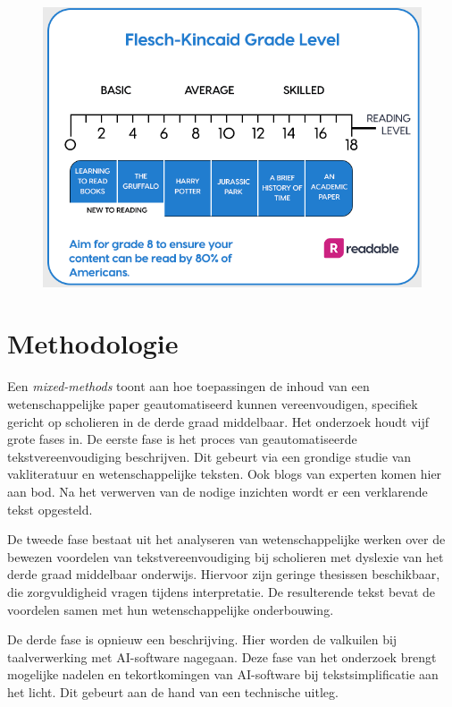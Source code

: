 \begin{figure}
	\includegraphics[width=\linewidth]{img/Screenshot_302.png}
	\caption{\autocite{Readable2021}}
\end{figure}

\section{Methodologie}%
\label{sec:methodologie}
Een \textit{mixed-methods} toont aan hoe toepassingen de inhoud van een wetenschappelijke paper geautomatiseerd kunnen vereenvoudigen, specifiek gericht op scholieren in de derde graad middelbaar. Het onderzoek houdt vijf grote fases in. De eerste fase is het proces van geautomatiseerde tekstvereenvoudiging beschrijven. Dit gebeurt via een grondige studie van vakliteratuur en wetenschappelijke teksten. Ook blogs van experten komen hier aan bod. Na het verwerven van de nodige inzichten wordt er een verklarende tekst opgesteld.

De tweede fase bestaat uit het analyseren van wetenschappelijke werken over de bewezen voordelen van tekstvereenvoudiging bij scholieren met dyslexie van het derde graad middelbaar onderwijs. Hiervoor zijn geringe thesissen beschikbaar, die zorgvuldigheid vragen tijdens interpretatie. De resulterende tekst bevat de voordelen samen met hun wetenschappelijke onderbouwing.

De derde fase is opnieuw een beschrijving. Hier worden de valkuilen bij taalverwerking met AI-software nagegaan. Deze fase van het onderzoek brengt mogelijke nadelen en tekortkomingen van AI-software bij tekstsimplificatie aan het licht. Dit gebeurt aan de hand van een technische uitleg.

